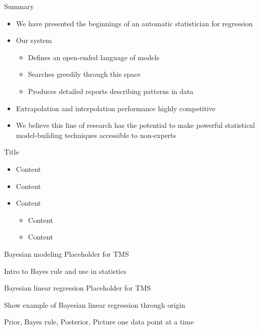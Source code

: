 \begin{frame}{Summary}
  \begin{itemize}
    \item We have presented the beginnings of an automatic statistician for regression
    \vspace{\baselineskip}
    \item Our system
    \begin{itemize}
      \item Defines an open-ended language of models
      \item Searches greedily through this space
      \item Produces detailed reports describing patterns in data
    \end{itemize}
    \vspace{\baselineskip}
    \item Extrapolation and interpolation performance highly competitive
    \vspace{\baselineskip}
    \item We believe this line of research has the potential to make powerful statistical model-building techniques accessible to non-experts
  \end{itemize}
\end{frame}



\begin{frame}{Title}
  \begin{itemize}
    \item Content
    \vspace{\baselineskip}
    \item Content
    \vspace{\baselineskip}
    \item Content
    \begin{itemize}
       \item Content
       \item Content
     \end{itemize}
  \end{itemize}
\end{frame}

\begin{frame}{Bayesian modeling}
  Placeholder for TMS
  
  Intro to Bayes rule and use in statistics
\end{frame}

\begin{frame}{Bayesian linear regression}
  Placeholder for TMS
  
  Show example of Bayesian linear regression through origin
  
  Prior, Bayes rule, Posterior, Picture one data point at a time
\end{frame}

